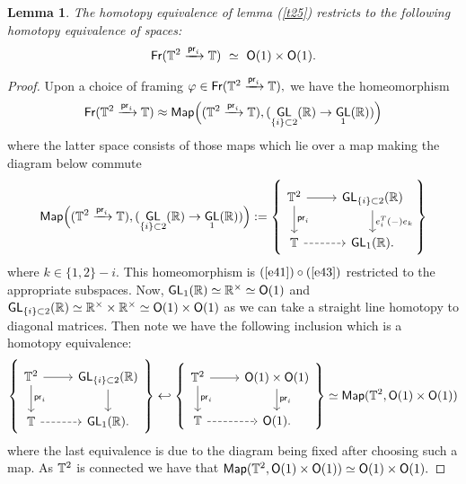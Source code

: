 \documentclass{amsart}
\newtheorem{lemma}[theorem]{Lemma}
\theoremstyle{definition}
\theoremstyle{remark}
\DeclareMathOperator{\pr}{\mathsf{pr}}
\newcommand{\xra}{\xrightarrow}
\DeclareMathOperator{\GL}{\sf GL}
\DeclareMathOperator{\Fr}{\sf Fr}
\begin{document}
\begin{lemma} \label{prfr}
The homotopy equivalence of lemma (\ref{t25}) restricts to the following homotopy equivalence of spaces:
\begin{equation} \label{e801}
\Fr(\TT^2 \xra{\pr_i} \TT)
~\simeq~
{\sf O}(1) \times {\sf O}(1). 
\end{equation}
\end{lemma}
\begin{proof}
Upon a choice of framing $\varphi \in \Fr(\TT^2 \xra{\pr_i} \TT),$ we have the homeomorphism 
\[
\Fr(\TT^2 \xra{\pr_i} \TT) \approx {\sf Map}\Big( (\TT^2 \xra{\pr_i} \TT), (\GL_{\{i\}\subset 2}(\RR) \rightarrow \GL_{1}(\RR)) \Big)
\]
where the latter space consists of those maps which lie over a map making the diagram below commute
\[ {\sf Map}\Big( (\TT^2 \xra{\pr_i} \TT), (\GL_{\{i\}\subset 2}(\RR) \rightarrow \GL_{1}(\RR)) \Big) :=
\left\{ \begin{tikzcd}
\TT^{2} \arrow[r] \arrow[d,"\pr_{i}"]
&
\GL_{\{i\}\subset 2}(\RR) \arrow[d, "e_{i}^{T}(-)e_{k}"]
\\
\TT \arrow[dashed, r]
&
\GL_{1}(\RR).
\end{tikzcd} \right\}
\]
where $k \in \{1, 2\} - i.$ This homeomorphism is $(\ref{e41}) \circ (\ref{e43})$ restricted to the appropriate subspaces.
Now, $\GL_{1}(\RR) \simeq \RR^{\times} \simeq {\sf O}(1)$ and $\GL_{\{i\}\subset 2}(\RR) \simeq \RR^{\times} \times \RR^{\times} \simeq {\sf O}(1) \times {\sf O}(1)$ as we can take a straight line homotopy to diagonal matrices. Then note we have the following inclusion which is a homotopy equivalence:
\[
\left\{ \begin{tikzcd}
\TT^{2} \arrow[r] \arrow[d,"\pr_{i}"]
&
\GL_{\{i\}\subset 2}(\RR) \arrow[d, ""]
\\
\TT \arrow[dashed, r]
&
\GL_{1}(\RR).
\end{tikzcd} \right\}
\hookleftarrow
\left\{ \begin{tikzcd}
\TT^{2} \arrow[r] \arrow[d,"\pr_{i}"]
&
{\sf O}(1) \times {\sf O}(1) \arrow[d, "\pr_{i}"]
\\
\TT \arrow[dashed, r]
&
{\sf O}(1).
\end{tikzcd} \right\} \simeq {\sf Map}(\TT^{2}, {\sf O}(1) \times {\sf O}(1))
\]
where the last equivalence is due to the diagram being fixed after choosing such a map. As $\mathbb T^{2}$ is connected we have that ${\sf Map}(\mathbb T^{2}, {\sf O}(1) \times {\sf O}(1)) \simeq {\sf O}(1) \times {\sf O}(1).$
\end{proof}
\end{document}
